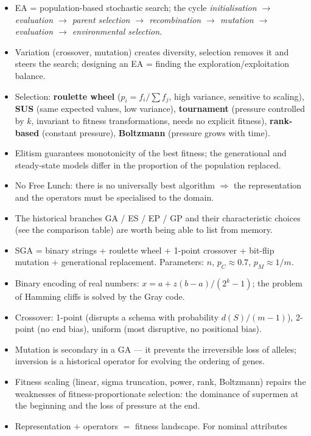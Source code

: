 \documentclass[11pt,a4paper]{article}
\theoremstyle{definition}
\begin{document}
\begin{itemize}
\item EA = population-based stochastic search; the cycle \emph{initialisation
  $\to$ evaluation $\to$ parent selection $\to$ recombination $\to$ mutation
  $\to$ evaluation $\to$ environmental selection}.
\item Variation (crossover, mutation) creates diversity, selection removes it
  and steers the search; designing an EA = finding the exploration/exploitation
  balance.
\item Selection: \textbf{roulette wheel} ($p_i = f_i/\sum f_j$, high variance,
  sensitive to scaling), \textbf{SUS} (same expected values, low variance),
  \textbf{tournament} (pressure controlled by $k$, invariant to fitness
  transformations, needs no explicit fitness), \textbf{rank-based} (constant
  pressure), \textbf{Boltzmann} (pressure grows with time).
\item Elitism guarantees monotonicity of the best fitness; the generational and
  steady-state models differ in the proportion of the population replaced.
\item No Free Lunch: there is no universally best algorithm $\Rightarrow$ the
  representation and the operators must be specialised to the domain.
\item The historical branches GA / ES / EP / GP and their characteristic choices
  (see the comparison table) are worth being able to list from memory.
\item SGA = binary strings + roulette wheel + 1-point crossover + bit-flip
  mutation + generational replacement. Parameters: $n$, $p_C \approx 0.7$,
  $p_M \approx 1/m$.
\item Binary encoding of real numbers: $x = a + z(b-a)/(2^k-1)$; the problem of
  Hamming cliffs is solved by the Gray code.
\item Crossover: 1-point (disrupts a schema with probability $d(S)/(m-1)$),
  2-point (no end bias), uniform (most disruptive, no positional bias).
\item Mutation is secondary in a GA --- it prevents the irreversible loss of
  alleles; inversion is a historical operator for evolving the ordering of
  genes.
\item Fitness scaling (linear, sigma truncation, power, rank, Boltzmann)
  repairs the weaknesses of fitness-proportionate selection: the dominance of
  supermen at the beginning and the loss of pressure at the end.
\item Representation $+$ operators $=$ fitness landscape. For nominal attributes

\end{itemize}
\end{document}

